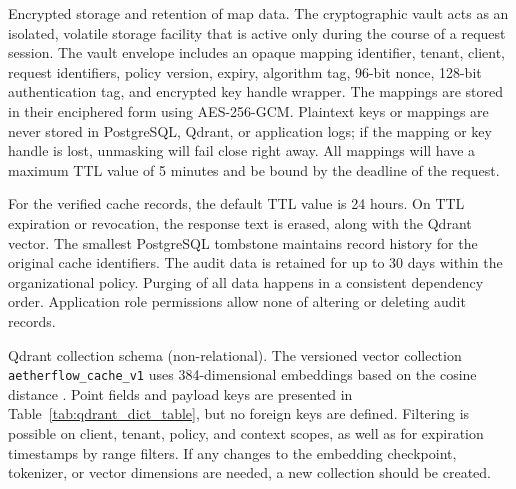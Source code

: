 \documentclass{FastFyp}
\begin{document}
\noindent Encrypted storage and retention of map data.
The cryptographic vault acts as an isolated, volatile storage facility that is active only during the course of a request session. The vault envelope includes an opaque mapping identifier, tenant, client, request identifiers, policy version, expiry, algorithm tag, 96-bit nonce, 128-bit authentication tag, and encrypted key handle wrapper. The mappings are stored in their enciphered form using AES-256-GCM. Plaintext keys or mappings are never stored in PostgreSQL, Qdrant, or application logs; if the mapping or key handle is lost, unmasking will fail close right away. All mappings will have a maximum TTL value of 5 minutes and be bound by the deadline of the request.

For the verified cache records, the default TTL value is 24 hours. On TTL expiration or revocation, the response text is erased, along with the Qdrant vector. The smallest PostgreSQL tombstone maintains record history for the original cache identifiers. The audit data is retained for up to 30 days within the organizational policy. Purging of all data happens in a consistent dependency order. Application role permissions allow none of altering or deleting audit records.

\noindent Qdrant collection schema (non-relational).
The versioned vector collection \texttt{aetherflow\_cache\_v1} uses 384-dimensional embeddings based on the cosine distance \cite{ref:MiniLM,ref:Qdrant}. Point fields and payload keys are presented in Table~\ref{tab:qdrant_dict_table}, but no foreign keys are defined. Filtering is possible on client, tenant, policy, and context scopes, as well as for expiration timestamps by range filters. If any changes to the embedding checkpoint, tokenizer, or vector dimensions are needed, a new collection should be created.
\end{document}
